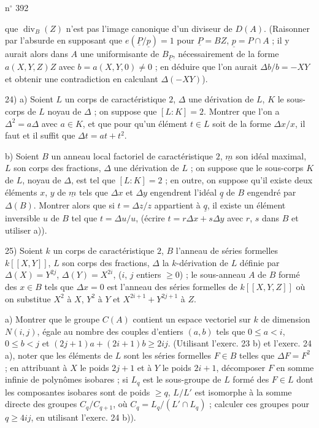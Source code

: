 \hfill n$^{\circ}$ 392

que $\operatorname{div}_{B}(Z)$ n'est pas l'image canonique d'un diviseur de $D(A)$. (Raisonner par l'absurde en supposant que $e(\underline{P}/\underline{p})=1$ pour $\underline{P}=BZ$, $\underline{p}=P\cap A$ ; il y aurait alors dans $A$ une uniformisante de $B_{\underline{P}}$, nécessairement de la forme $a(X,Y,Z)Z$ avec $b=a(X,Y,0)\ne 0$ ; en déduire que l'on aurait $\Delta b/b=-XY$ et obtenir une contradiction en calculant $\Delta(-XY)$).

24) \qquad a) Soient $L$ un corps de caractéristique $2$, $\Delta$ une dérivation de $L$, $K$ le sous-corps de $L$ noyau de $\Delta$ ; on suppose que $[L:K]=2$. Montrer que l'on a $\Delta^2=a\Delta$ avec $a\in K$, et que pour qu'un élément $t\in L$ soit de la forme $\Delta x/x$, il faut et il suffit que $\Delta t=at+t^2$.

b) Soient $B$ un anneau local factoriel de caractéristique $2$, $\underline{m}$ son idéal maximal, $L$ son corps des fractions, $\Delta$ une dérivation de $L$ ; on suppose que le sous-corps $K$ de $L$, noyau de $\Delta$, est tel que $[L:K]=2$ ; en outre, on suppose qu'il existe deux éléments $x$, $y$ de $\underline{m}$ tels que $\Delta x$ et $\Delta y$ engendrent l'idéal $\underline{q}$ de $B$ engendré par $\Delta(B)$. Montrer alors que si $t=\Delta z/z$ appartient à $\underline{q}$, il existe un élément inversible $u$ de $B$ tel que $t=\Delta u/u$, (écrire $t=r\Delta x+s\Delta y$ avec $r$, $s$ dans $B$ et utiliser a)).

25) Soient $k$ un corps de caractéristique $2$, $B$ l'anneau de séries formelles $k[[X,Y]]$, $L$ son corps des fractions, $\Delta$ la $k$-dérivation de $L$ définie par $\Delta(X)=Y^{2j}$, $\Delta(Y)=X^{2i}$, ($i$, $j$ entiers $\geq 0$) ; le sous-anneau $A$ de $B$ formé des $x\in B$ tels que $\Delta x=0$ est l'anneau des séries formelles de $k[[X,Y,Z]]$ où on substitue $X^2$ à $X$, $Y^2$ à $Y$ et $X^{2i+1}+Y^{2j+1}$ à $Z$.

a) Montrer que le groupe $C(A)$ contient un espace vectoriel sur $k$ de dimension $N(i,j)$, égale au nombre des couples d'entiers $(a,b)$ tels que $0\leq a<i$, $0\leq b<j$ et $(2j+1)a+(2i+1)b\geq 2ij$. (Utilisant l'exerc. 23 b) et l'exerc. 24 a), noter que les éléments de $L$ sont les séries formelles $F\in B$ telles que $\Delta F=F^2$ ; en attribuant à $X$ le poids $2j+1$ et à $Y$ le poids $2i+1$, décomposer $F$ en somme infinie de polynômes isobares ; si $L_q$ est le sous-groupe de $L$ formé des $F\in L$ dont les composantes isobares sont de poids $\geq q$, $L/L'$ est isomorphe à la somme directe des groupes $C_q/C_{q+1}$, où $C_q=L_q/(L'\cap L_q)$ ; calculer ces groupes pour $q\geq 4ij$, en utilisant l'exerc. 24 b)).

